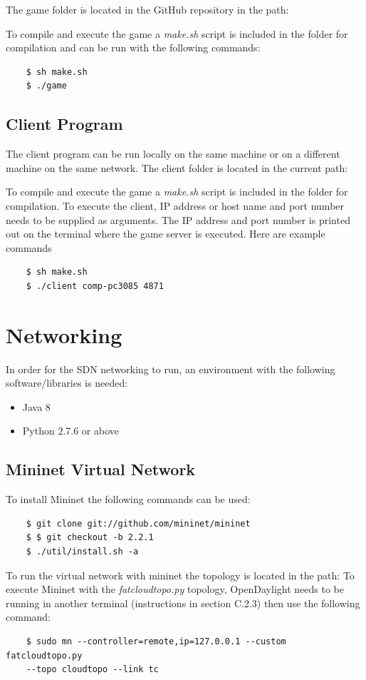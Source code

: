\begin{appendices}
The game folder is located in the GitHub repository in the path:
\newline
{}
\newline
\par
To compile and execute the game a \textit{make.sh} script is included in the folder for compilation and can be run with the following commands:
\begin{verbatim}
	$ sh make.sh
	$ ./game
\end{verbatim}

\subsection{Client Program}

The client program can be run locally on the same machine or on a different machine on the same network. The client folder is located in the current path:
\newline
{}
\newline
\par
To compile and execute the game a \textit{make.sh} script is included in the folder for compilation. To execute the client, IP address or host name and port number needs to be supplied as arguments. The IP address and port number is printed out on the terminal where the game server is executed. Here are example commands
\begin{verbatim}
	$ sh make.sh
	$ ./client comp-pc3085 4871
\end{verbatim}

\section{Networking}
In order for the SDN networking to run, an environment with the following software/libraries is needed:

\begin{itemize}
	\item Java 8
	\item Python 2.7.6 or above
\end{itemize}
 
\subsection{Mininet Virtual Network}
To install Mininet the following commands can be used:
\begin{verbatim}
	$ git clone git://github.com/mininet/mininet
	$ $ git checkout -b 2.2.1
	$ ./util/install.sh -a
\end{verbatim}
To run the virtual network with mininet the topology is located in the path:
To execute Mininet with the \textit{fatcloudtopo.py} topology, OpenDaylight needs to be running in another terminal (instructions in section C.2.3) then use the following command:
\begin{verbatim}
	$ sudo mn --controller=remote,ip=127.0.0.1 --custom fatcloudtopo.py 
	--topo cloudtopo --link tc
\end{verbatim}


\end{appendices}
